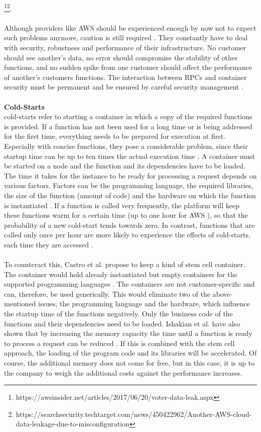 \documentclass[a4paper,11pt, pagesize]{scrartcl}
\begin{document}
\begin{spacing}{1.2}
\footnote{https://awsinsider.net/articles/2017/06/20/voter-data-leak.aspx}\footnote{https://searchsecurity.techtarget.com/news/450422962/Another-AWS-cloud-data-leakage-due-to-misconfiguration}.\\\\ Although providers like AWS should be experienced enough by now not to expect such problems anymore, caution is still required \cite{fowler2018serverless}. They constantly have to deal with security, robustness and performance of their infrastructure. No customer should see another's data, no error should compromise the stability of other functions, and no sudden spike from one customer should affect the performance of another's customers functions. The interaction between RPCs and container security must be permanent and be ensured by careful security management \cite{mcgrath2017serverless}.\\\\ \textbf{Cold-Starts}\\ cold-starts refer to starting a container in which a copy of the required functions is provided. If a function has not been used for a long time or is being addressed for the first time, everything needs to be prepared for execution at first. Especially with concise functions, they pose a considerable problem, since their startup time can be up to ten times the actual execution time \cite{shahrad2019architectural}. A container must be started on a node and the function and its dependencies have to be loaded. The time it takes for the instance to be ready for processing a request depends on various factors. Factors can be the programming language, the required libraries, the size of the function (amount of code) and the hardware on which the function is instantiated \cite{shafiei2020serverless} \cite{jonas2019cloud}. If a function is called very frequently, the platform will keep these functions \glqq warm\grqq{} for a certain time (up to one hour for AWS \cite{roberts2017serverless}), so that the probability of a new cold-start tends towards zero. In contrast, functions that are called only once per hour are more likely to experience the effects of cold-starts, each time they are accessed \cite{roberts2017serverless}.\\\\ To counteract this, Castro et al. propose to keep a kind of stem cell container. The container would hold already instantiated but empty containers for the supported programming languages \cite{castro2019server}. The containers are not customer-specific and can, therefore, be used generically. This would eliminate two of the above-mentioned issues, the programming language and the hardware, which influence the startup time of the functions negatively. Only the business code of the functions and their dependencies need to be loaded. Ishakian et al. have also shown that by increasing the memory capacity the time until a function is ready to process a request can be reduced \cite{ishakian2018serving}. If this is combined with the stem cell approach, the loading of the program code and its libraries will be accelerated. Of course, the additional memory does not come for free, but in this case, it is up to the company to weigh the additional costs against the performance increases.

\end{spacing}
\end{document}
